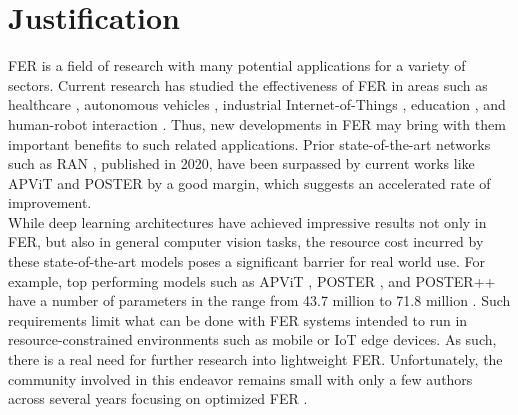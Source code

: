 \documentclass[../main.tex]{subfiles}
\begin{document}

\section{Justification}

FER is a field of research with many potential applications for a variety of sectors.
Current research has studied the effectiveness of FER in areas such as healthcare \cite{muhammad2017health}, autonomous vehicles \cite{zaman2022car}, industrial Internet-of-Things \cite{xi2021iot}, education \cite{savchenko2022edu}, and human-robot interaction \cite{wu2021hri}.
Thus, new developments in FER may bring with them important benefits to such related applications. 
Prior state-of-the-art networks such as RAN \cite{wang2020ran}, published in 2020, have been surpassed by current works like APViT \cite{apvit2023} and POSTER \cite{zheng2023poster} by a good margin, which suggests an accelerated rate of improvement.\\

While deep learning architectures have achieved impressive results not only in FER, but also in general computer vision tasks, the resource cost incurred by these state-of-the-art models poses a significant barrier for real world use.
For example, top performing models such as APViT \cite{apvit2023}, POSTER \cite{zheng2023poster}, and POSTER++ \cite{mao2023posterv2} have a number of parameters in the range from 43.7 million to 71.8 million \cite{lengwe2023pattlite}.
Such requirements limit what can be done with FER systems intended to run in resource-constrained environments such as mobile or IoT edge devices.
As such, there is a real need for further research into lightweight FER.
Unfortunately, the community involved in this endeavor remains small with only a few authors across several years focusing on optimized FER \cite{eff-face2021}.
\end{document}
